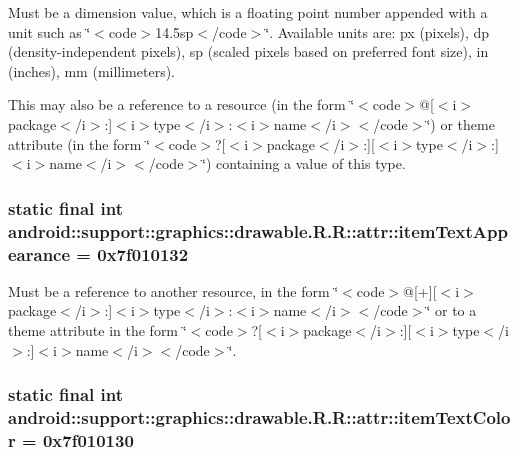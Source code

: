 Must be a dimension value, which is a floating point number appended with a unit such as \char`\"{}$<$code$>$14.5sp$<$/code$>$\char`\"{}. Available units are: px (pixels), dp (density-independent pixels), sp (scaled pixels based on preferred font size), in (inches), mm (millimeters). 

This may also be a reference to a resource (in the form \char`\"{}$<$code$>$@\mbox{[}$<$i$>$package$<$/i$>$:\mbox{]}$<$i$>$type$<$/i$>$:$<$i$>$name$<$/i$>$$<$/code$>$\char`\"{}) or theme attribute (in the form \char`\"{}$<$code$>$?\mbox{[}$<$i$>$package$<$/i$>$:\mbox{]}\mbox{[}$<$i$>$type$<$/i$>$:\mbox{]}$<$i$>$name$<$/i$>$$<$/code$>$\char`\"{}) containing a value of this type. \hypertarget{classandroid_1_1support_1_1graphics_1_1drawable_1_1_r_1_1attr_c00b33ea39bce3b0da405549e3a0af3d}{
\subsubsection[{itemTextAppearance}]{\setlength{\rightskip}{0pt plus 5cm}static final int android::support::graphics::drawable.R.R::attr::itemTextAppearance = 0x7f010132}}
\label{classandroid_1_1support_1_1graphics_1_1drawable_1_1_r_1_1attr_c00b33ea39bce3b0da405549e3a0af3d}


Must be a reference to another resource, in the form \char`\"{}$<$code$>$@\mbox{[}+\mbox{]}\mbox{[}$<$i$>$package$<$/i$>$:\mbox{]}$<$i$>$type$<$/i$>$:$<$i$>$name$<$/i$>$$<$/code$>$\char`\"{} or to a theme attribute in the form \char`\"{}$<$code$>$?\mbox{[}$<$i$>$package$<$/i$>$:\mbox{]}\mbox{[}$<$i$>$type$<$/i$>$:\mbox{]}$<$i$>$name$<$/i$>$$<$/code$>$\char`\"{}. \hypertarget{classandroid_1_1support_1_1graphics_1_1drawable_1_1_r_1_1attr_4bc331851367acdd88d68e403fc93688}{
\subsubsection[{itemTextColor}]{\setlength{\rightskip}{0pt plus 5cm}static final int android::support::graphics::drawable.R.R::attr::itemTextColor = 0x7f010130}}
\label{classandroid_1_1support_1_1graphics_1_1drawable_1_1_r_1_1attr_4bc331851367acdd88d68e403fc93688}



